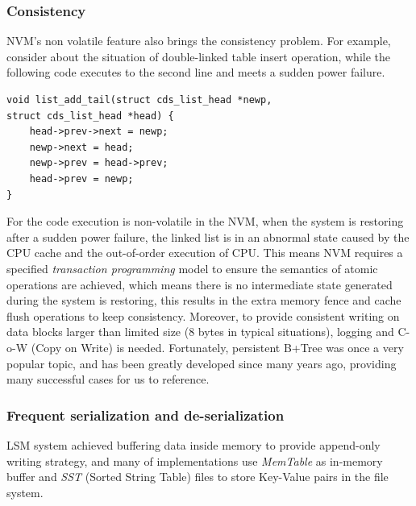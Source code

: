 \subsubsection{Consistency}\label{sec:8bytes-law}

NVM's non volatile feature also brings the consistency problem. For example, consider about the situation of double-linked table insert operation, while the following code executes to the second line and meets a sudden power failure.
\begin{verbatim}
void list_add_tail(struct cds_list_head *newp,
struct cds_list_head *head) {
	head->prev->next = newp;
	newp->next = head;
	newp->prev = head->prev;
	head->prev = newp;
}
\end{verbatim}
For the code execution is non-volatile in the NVM, when the system is restoring after a sudden power failure, the linked list is in an abnormal state caused by the CPU cache and the out-of-order execution of CPU. This means NVM requires a specified \textit{transaction programming} model\cite{volos2011mnemosyne,dulloor2014system,ren2015thynvm,188438} to ensure the semantics of atomic operations are achieved, which means there is no intermediate state generated during the system is restoring, this results in the extra memory fence and cache flush operations to keep consistency. Moreover, to provide consistent writing on data blocks larger than limited size (8 bytes in typical situations), logging and C-o-W (Copy on Write) is needed. Fortunately, persistent B+Tree\cite{188438,oukid2016fptree} was once a very popular topic, and has been greatly developed since many years ago, providing many successful cases for us to reference.

\subsubsection{Frequent serialization and de-serialization}

LSM system achieved buffering data inside memory to provide append-only writing strategy, and many of implementations use \textit{MemTable} as in-memory buffer and \textit{SST} (Sorted String Table) files to store Key-Value pairs in the file system. 

